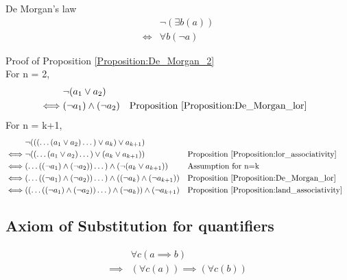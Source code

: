 \begin{prop}
\label{Proposition:De_Morgan_2}
De Morgan's law
\begin{align*}
& \lnot (\exists b (a)) \\
\iff & \forall b (\lnot a)
\end{align*}
\end{prop}

Proof of Proposition \ref{Proposition:De_Morgan_2} \\
For n = 2,
\begin{align*}
& \lnot (a_1 \lor a_2) \\
\iff & (\lnot a_1) \land (\lnot a_2)
& & \text{Proposition \ref{Proposition:De_Morgan_lor}} \\
\end{align*}
For n = k+1,
\begin{align*}
& \lnot ((( \dots (a_1 \lor a_2) \dots ) \lor a_k ) \lor a_{k+1}) \\
\iff & \lnot (( \dots (a_1 \lor a_2) \dots ) \lor ( a_k \lor a_{k+1}))
& & \text{Proposition \ref{Proposition:lor_associativity}} \\
\iff & ( \dots ((\lnot a_1) \land (\lnot a_2)) \dots ) \land (\lnot (a_k \lor a_{k+1}))
& & \text{Assumption for n=k} \\
\iff & ( \dots ((\lnot a_1) \land (\lnot a_2)) \dots ) \land ((\lnot a_k) \land (\lnot a_{k+1}))
& & \text{Proposition \ref{Proposition:De_Morgan_lor}} \\
\iff & (( \dots ((\lnot a_1) \land (\lnot a_2)) \dots ) \land (\lnot a_k)) \land (\lnot a_{k+1})
& & \text{Proposition \ref{Proposition:land_associativity}} \\
\end{align*}

\subsection{Axiom of Substitution for quantifiers}
\begin{prop}
\label{Proposition:implies_substitution_forall_2}
\begin{align*}
& \forall c (a \implies b) \\
\implies & (\forall c (a)) \implies (\forall c (b))
\end{align*}
\end{prop}

